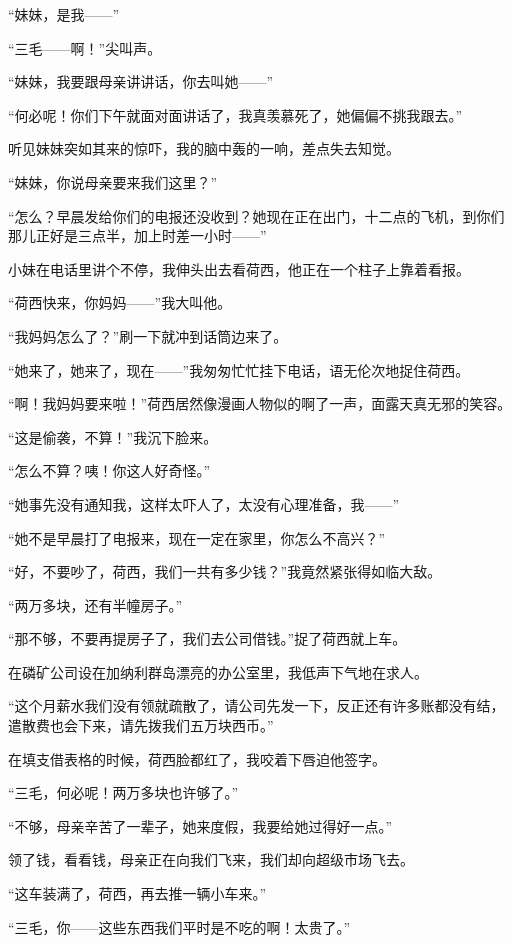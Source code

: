 \par “妹妹，是我——”
\par “三毛——啊！”尖叫声。
\par “妹妹，我要跟母亲讲讲话，你去叫她——”
\par “何必呢！你们下午就面对面讲话了，我真羡慕死了，她偏偏不挑我跟去。”
\par 听见妹妹突如其来的惊吓，我的脑中轰的一响，差点失去知觉。
\par “妹妹，你说母亲要来我们这里？”
\par “怎么？早晨发给你们的电报还没收到？她现在正在出门，十二点的飞机，到你们那儿正好是三点半，加上时差一小时——”
\par 小妹在电话里讲个不停，我伸头出去看荷西，他正在一个柱子上靠着看报。
\par “荷西快来，你妈妈——”我大叫他。
\par “我妈妈怎么了？”刷一下就冲到话筒边来了。
\par “她来了，她来了，现在——”我匆匆忙忙挂下电话，语无伦次地捉住荷西。
\par “啊！我妈妈要来啦！”荷西居然像漫画人物似的啊了一声，面露天真无邪的笑容。
\par “这是偷袭，不算！”我沉下脸来。
\par “怎么不算？咦！你这人好奇怪。”
\par “她事先没有通知我，这样太吓人了，太没有心理准备，我——”
\par “她不是早晨打了电报来，现在一定在家里，你怎么不高兴？”
\par “好，不要吵了，荷西，我们一共有多少钱？”我竟然紧张得如临大敌。
\par “两万多块，还有半幢房子。”
\par “那不够，不要再提房子了，我们去公司借钱。”捉了荷西就上车。
\par 在磷矿公司设在加纳利群岛漂亮的办公室里，我低声下气地在求人。
\par “这个月薪水我们没有领就疏散了，请公司先发一下，反正还有许多账都没有结，遣散费也会下来，请先拨我们五万块西币。”
\par 在填支借表格的时候，荷西脸都红了，我咬着下唇迫他签字。
\par “三毛，何必呢！两万多块也许够了。”
\par “不够，母亲辛苦了一辈子，她来度假，我要给她过得好一点。”
\par 领了钱，看看钱，母亲正在向我们飞来，我们却向超级市场飞去。
\par “这车装满了，荷西，再去推一辆小车来。”
\par “三毛，你——这些东西我们平时是不吃的啊！太贵了。”
